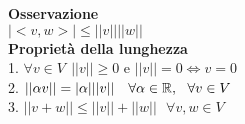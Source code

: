 \documentclass[12px]{article}
\begin{document}
\textbf{Osservazione}\\
$|<v,w>|\leq ||v||||w||$\\
\textbf{Proprietà della lunghezza}\\
1. $\forall v\in V \ \ ||v|| \geq 0$ e $||v|| = 0 \Leftrightarrow v = 0$\\
2. $||\alpha v|| = |\alpha| ||v||\ \ \ \forall \alpha\in \mathbb{R}, \ \ \forall v\in V$ \\
3. $||v+w|| \leq ||v|| + ||w|| \ \ \ \forall v,w\in V$
\end{document}

